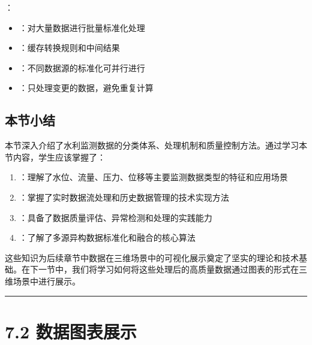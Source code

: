 ：

\begin{itemize}
\tightlist
\item
  ：对大量数据进行批量标准化处理
\item
  ：缓存转换规则和中间结果
\item
  ：不同数据源的标准化可并行进行
\item
  ：只处理变更的数据，避免重复计算
\end{itemize}

\hypertarget{ux672cux8282ux5c0fux7ed3}{%
\subsection{本节小结}\label{ux672cux8282ux5c0fux7ed3}}

本节深入介绍了水利监测数据的分类体系、处理机制和质量控制方法。通过学习本节内容，学生应该掌握了：

\begin{enumerate}
\def\labelenumi{\arabic{enumi}.}
\tightlist
\item
  ：理解了水位、流量、压力、位移等主要监测数据类型的特征和应用场景
\item
  ：掌握了实时数据流处理和历史数据管理的技术实现方法
\item
  ：具备了数据质量评估、异常检测和处理的实践能力
\item
  ：了解了多源异构数据标准化和融合的核心算法
\end{enumerate}

这些知识为后续章节中数据在三维场景中的可视化展示奠定了坚实的理论和技术基础。在下一节中，我们将学习如何将这些处理后的高质量数据通过图表的形式在三维场景中进行展示。

\begin{center}\rule{0.5\linewidth}{0.5pt}\end{center}


\hypertarget{ux6570ux636eux56feux8868ux5c55ux793a}{%
\section{7.2 数据图表展示}\label{ux6570ux636eux56feux8868ux5c55ux793a}}

